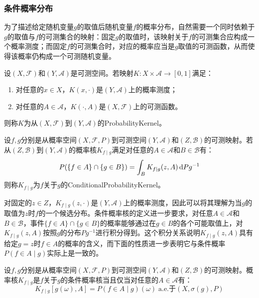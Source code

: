 \subsubsection{条件概率分布}
为了描述给定随机变量$g$的取值后随机变量$f$的概率分布，自然需要一个同时依赖于$g$的取值与$f$的可测集合的映射：固定$g$的取值时，该映射关于$f$的可测集合应构成一个概率测度；而固定$f$的可测集合时，对应的概率应当是$g$取值的可测函数，从而使得该概率仍构成一个可测随机变量。
\begin{definition}
	设$(X,\mathscr{F})$和$(Y,\mathscr{A})$是可测空间。若映射$K:X\times\mathscr{A}\to[0,1]$满足：
	\begin{enumerate}
		\item 对任意的$x\in X$，$K(x,\cdot)$是$(Y,\mathscr{A})$上的概率测度；
		\item 对任意的$A\in\mathscr{A}$，$K(\cdot,A)$是$(X,\mathscr{F})$上的可测函数。
	\end{enumerate}
	则称$K$为从$(X,\mathscr{F})$到$(Y,\mathscr{A})$的\gls{ProbabilityKernel}。
\end{definition}
\begin{definition}
	设$f,g$分别是从概率空间$(X,\mathscr{F},P)$到可测空间$(Y,\mathscr{A})$和$(Z,\mathscr{B})$的可测映射。若从$(Z,\mathscr{B})$到$(Y,\mathscr{A})$的概率核$K_{f\mid g}$满足对任意的$A\in\mathscr{A}$和$B\in\mathscr{B}$有：
	\begin{equation*}
		P(\{f\in A\}\cap\{g\in B\})=\int_{B}K_{f\mid g}(z,A)\mathop{}\!\mathrm{d} Pg^{-1}
	\end{equation*}
	则称$K_{f\mid g}$为$f$关于$g$的\gls{ConditionalProbabilityKernel}。
\end{definition}
对固定的$z\in Z$，$K_{f\mid g}(z,\cdot)$是$(Y,\mathscr{A})$上的概率测度，因此可以将其理解为当$g$的取值为$z$时$f$的一个候选分布。条件概率核的定义进一步要求，对任意$A\in\mathscr{A}$和$B\in\mathscr{B}$，事件$\{f\in A\}\cap\{g\in B\}$的概率能够通过在$g\in B$的各个可能取值上，对$K_{f\mid g}(z,A)$按照$g$的分布$Pg^{-1}$进行积分得到。这个积分关系说明$K_{f\mid g}(z,A)$具有给定$g=z$时$f\in A$的概率的含义，而下面的性质进一步表明它与条件概率$P(f\in A\mid g)$实际上是一致的。
\begin{property}\label{prop:ConditionalProbabilityKernel}
	设$f,g$分别是从概率空间$(X,\mathscr{F},P)$到可测空间$(Y,\mathscr{A})$和$(Z,\mathscr{B})$的可测映射。概率核$K_{f\mid g}$是$f$关于$g$的条件概率核当且仅当对任意的$A\in\mathscr{A}$有：
	\begin{equation*}
		K_{f\mid g}[g(\omega),A]=P(f\in A\mid g)(\omega)\;\text{a.e.于$(X,\sigma(g),P)$}
	\end{equation*}
\end{property}

